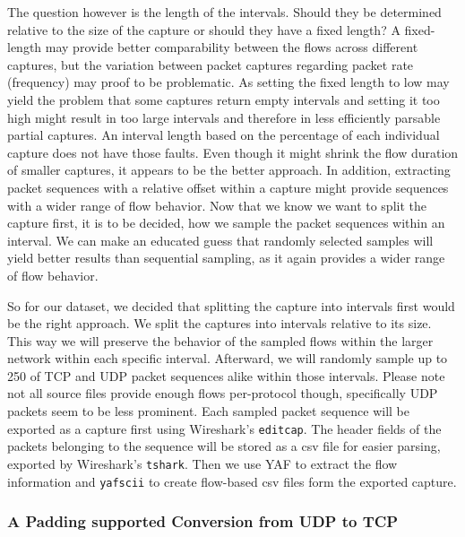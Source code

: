 \documentclass[
	ngerman,
	ruledheaders=section,%
	class=report,%
	thesis={type=bachelor},%
	accentcolor=9c,%
	custommargins=true,%
	marginpar=false,%
	parskip=half-,%
	fontsize=11pt,%
]{tudapub}
\let\code\texttt
\begin{document}
The question however is the length of the intervals.
Should they be determined relative to the size of the capture or should they have a fixed length?
A fixed-length may provide better comparability between the flows across different captures,
but the variation between packet captures regarding packet rate (frequency) may proof to be problematic.
As setting the fixed length to low may yield the problem that some captures return empty intervals
and setting it too high might result in too large intervals and therefore in less efficiently parsable partial captures.
An interval length based on the percentage of each individual capture does not have those faults.
Even though it might shrink the flow duration of smaller captures, it appears to be the better approach.
In addition, extracting packet sequences with a relative offset within a capture might provide sequences with a wider range of flow behavior.
Now that we know we want to split the capture first, it is to be decided, how we sample the packet sequences within an interval.
We can make an educated guess that randomly selected samples will yield better results than sequential sampling, as it again provides a wider range of flow behavior.

So for our dataset, we decided that splitting the capture into intervals first would be the right approach.
We split the captures into intervals relative to its size.
This way we will preserve the behavior of the sampled flows within the larger network within each specific interval.
Afterward, we will randomly sample up to 250 of TCP and UDP packet sequences alike within those intervals.
Please note not all source files provide enough flows per-protocol though, specifically UDP packets seem to be less prominent.
Each sampled packet sequence will be exported as a capture first using Wireshark's \code{editcap}.
The header fields of the packets belonging to the sequence will be stored as a csv file for easier parsing, exported by Wireshark's \code{tshark}.
Then we use YAF to extract the flow information and \code{yafscii} to create flow-based csv files form the exported capture.

\subsubsection{A Padding supported Conversion from UDP to TCP}
\label{sec:UDPpadding}
\end{document}
